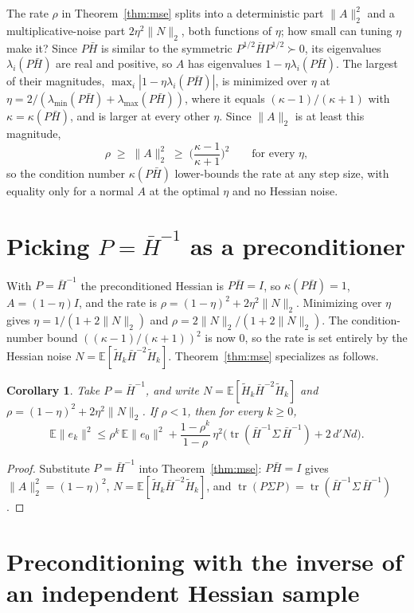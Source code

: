 \documentclass[11pt]{article}
\newcommand{\Hbar}{\bar{H}}
\newcommand{\E}{\mathbb{E}}
\newcommand{\tr}{\operatorname{tr}}
\newtheorem{corollary}{Corollary}
\begin{document}
The rate $\rho$ in Theorem~\ref{thm:mse} splits into a deterministic part
$\|A\|_2^2$ and a multiplicative-noise part $2\eta^2\|N\|_2$, both functions of
$\eta$; how small can tuning $\eta$ make it? Since $P\Hbar$ is similar to the
symmetric $P^{1/2}\Hbar P^{1/2}\succ0$, its eigenvalues $\lambda_i(P\Hbar)$ are
real and positive, so $A$ has eigenvalues $1-\eta\lambda_i(P\Hbar)$. The largest
of their magnitudes, $\max_i|1-\eta\lambda_i(P\Hbar)|$, is minimized over $\eta$
at $\eta=2/(\lambda_{\min}(P\Hbar)+\lambda_{\max}(P\Hbar))$, where it equals
$(\kappa-1)/(\kappa+1)$ with $\kappa=\kappa(P\Hbar)$, and is larger at every other
$\eta$. Since $\|A\|_2$ is at least this magnitude,
\[
    \rho\;\ge\;\|A\|_2^2\;\ge\;\Big(\frac{\kappa-1}{\kappa+1}\Big)^2
    \qquad\text{for every }\eta ,
\]
so the condition number $\kappa(P\Hbar)$ lower-bounds the rate at any step size,
with equality only for a normal $A$ at the optimal $\eta$ and no Hessian noise.


\section{Picking $P=\Hbar^{-1}$ as a preconditioner}

With $P=\Hbar^{-1}$ the preconditioned Hessian is $P\Hbar=I$, so $\kappa(P\Hbar)=1$,
$A=(1-\eta)I$, and the rate is $\rho=(1-\eta)^2+2\eta^2\|N\|_2$. Minimizing over
$\eta$ gives $\eta=1/(1+2\|N\|_2)$ and $\rho=2\|N\|_2/(1+2\|N\|_2)$. The
condition-number bound $((\kappa-1)/(\kappa+1))^2$ is now $0$, so the rate is set
entirely by the Hessian noise $N=\E[\tilde{H}_k\Hbar^{-2}\tilde{H}_k]$.
Theorem~\ref{thm:mse} specializes as follows.
\begin{corollary}
    Take $P=\Hbar^{-1}$, and write $N=\E[\tilde{H}_k\Hbar^{-2}\tilde{H}_k]$ and
    $\rho=(1-\eta)^2+2\eta^2\|N\|_2$. If $\rho<1$, then for every $k\ge0$,
    \[
        \E\|e_k\|^2\le\rho^k\,\E\|e_0\|^2
        +\frac{1-\rho^k}{1-\rho}\,\eta^2\big(\tr(\Hbar^{-1}\Sigma\,\Hbar^{-1})
        +2\,d'Nd\big).
    \]
\end{corollary}

\begin{proof}
    Substitute $P=\Hbar^{-1}$ into Theorem~\ref{thm:mse}: $P\Hbar=I$ gives
    $\|A\|_2^2=(1-\eta)^2$, $N=\E[\tilde{H}_k\Hbar^{-2}\tilde{H}_k]$, and
    $\tr(P\Sigma P)=\tr(\Hbar^{-1}\Sigma\,\Hbar^{-1})$.
\end{proof}


\section{Preconditioning with the inverse of an independent Hessian sample}
\end{document}
